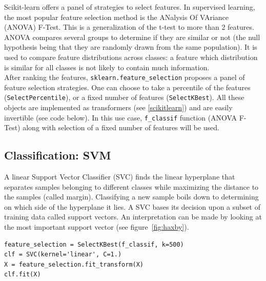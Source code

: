 \documentclass{frontiersSCNS} %
\begin{document}
Scikit-learn offers a panel of strategies to select features. In supervised
learning, the most popular feature selection method is the
ANalysis Of VAriance (ANOVA) F-Test. This is a generalization of the t-test to
more than 2 features.
ANOVA compares several groups to determine if they are similar or not (the null
hypothesis being that they are randomly drawn from the same population).
It is used to compare feature distributions across classes: a feature which
distribution is similar for all classes is not likely to contain much
information.\\

After ranking the features, \verb!sklearn.feature_selection! proposes a panel
of feature selection strategies. One can choose to take a percentile of the features
(\verb!SelectPercentile!), or a fixed number of features (\verb!SelectKBest!).
All these objects are implemented as transformers (see
\ref{scikitlearn}) and are easily invertible (see code below).
In this use case, \verb!f_classif! function (ANOVA F-Test) along with selection
of a fixed number of features will be used.

\subsection{Classification: SVM}

A linear Support Vector Classifier (SVC) finds the linear
hyperplane that separates samples belonging to different classes while
maximizing the distance to the samples (called margin).
Classifying a new sample boils down to 
determining on which side of the hyperplane it lies.
A SVC bases its decision upon a subset of training data called
support vectors. An interpretation can be made by looking at the most important
support vector (see figure~\ref{fig:haxby}).

\begin{lstlisting}
feature_selection = SelectKBest(f_classif, k=500)
clf = SVC(kernel='linear', C=1.)
X = feature_selection.fit_transform(X)
clf.fit(X)
\end{lstlisting}


\end{document}
